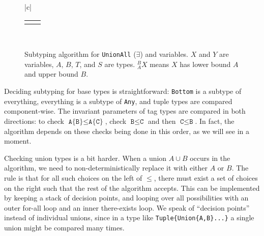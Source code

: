 \begin{figure}
\begin{center}
\begin{tabular}{|c|}
\begin{tabular}{cc}
        \\[8pt]

        \AxiomC{$_A^BX^R,\Gamma\ \vdash\ A \leq T$}
        \UnaryInfC{$_A^TX^R,\Gamma\ \vdash\ X \leq T$}
        \DisplayProof

        \hspace{4ex}

        &

        \AxiomC{$_A^BX^R,\Gamma\ \vdash\ T \leq B$}
        \UnaryInfC{$_{A \cup T}^{\ \ \ B}X^R,\Gamma\ \vdash\ T \leq X$}
        \DisplayProof

        \\[8pt]
      \end{tabular}
      \\
      \hline
    \end{tabular}
  \end{center}
  \caption{
    Subtyping algorithm for \texttt{UnionAll} ($\exists$) and variables.
    $X$ and $Y$ are variables, $A$, $B$, $T$, and $S$ are types.
    $_A^BX$ means $X$ has lower bound $A$ and upper bound $B$.
  }
  \label{subtvars}
\end{figure}


Deciding subtyping for base types is straightforward: \texttt{Bottom} is
a subtype of everything, everything is a subtype of \texttt{Any}, and
tuple types are compared component-wise. The invariant parameters
of tag types are compared in both directions: to check
$\texttt{A\{B\}}\leq \texttt{A\{C\}}$, check $\texttt{B}\leq\texttt{C}$ and
then $\texttt{C}\leq\texttt{B}$. In fact, the algorithm depends on these
checks being done in this order, as we will see in a moment.

Checking union types is a bit harder. When a union $A\cup B$ occurs in the
algorithm, we need to non-deterministically replace it with either $A$ or
$B$. The rule is that for all such choices on the left of $\leq$, there
must exist a set of choices on the right such that the rest of the
algorithm accepts. This can be implemented by keeping a stack of
decision points, and looping over all possibilities with an outer
for-all loop and an inner there-exists loop. We speak of ``decision points''
instead of individual unions, since in a type like \texttt{Tuple\{Union\{A,B\}...\}}
a single union might be compared many times.

